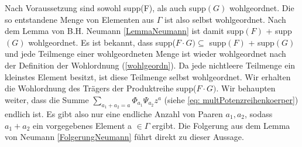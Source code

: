 Nach Voraussetzung sind sowohl supp(F), als auch supp$(G)$ wohlgeordnet. Die so entstandene Menge von Elementen aus $\Gamma$ ist also selbst wohlgeordnet. Nach dem Lemma von B.H. Neumann \ref{LemmaNeumann} ist damit supp$(F)$ + supp$(G)$ wohlgeordnet. Es ist bekannt, dass supp($F\cdot G) \subseteq$ supp$(F)$ + supp$(G)$ und jede Teilmenge einer wohlgeordneten Menge ist wieder wohlgeordnet nach der Definition der Wohlordnung (\ref{wohlgeordn}). Da jede nichtleere Teilmenge ein kleinstes Element besitzt, ist diese Teilmenge selbst wohlgeordnet. Wir erhalten die Wohlordnung des Trägers der Produktreihe supp($F\cdot G)$.
Wir behaupten weiter, dass die Summe $\sum_{a_1 + a_2 = a}^{}\Phi_{a_1} \Psi_{a_2} z^a$ (siehe \ref{eq: multPotenzreihenkoerper}) endlich ist. Es gibt also nur eine endliche Anzahl von Paaren $a_1, a_2$, sodass $a_1 + a_2$ ein vorgegebenes Element a $\in \Gamma$ ergibt. Die Folgerung aus dem Lemma von Neumann \ref{FolgerungNeumann} führt direkt zu dieser Aussage.  \\
